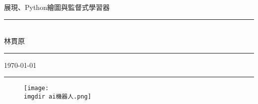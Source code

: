 \documentclass[12pt, a4paper]{book}
\begin{document}
\renewcommand{\tablename}{表}	
\renewcommand{\figurename}{圖}
\fontsize{36}{30pt}\selectfont
\thispagestyle{empty}
\begin{flushright}
    {\MB \XeLaTeX 展現、Python繪圖與監督式學習器}\\
    \rule{3in}{0.2pt}\\
    \medskip\hfill \Large {\KT 林貫原}\rule{8mm}{0pt}
    \medskip \par\vspace*{-2pt}\hfill \small\today\rule{8mm}{0pt}
\end{flushright}
\bigskip\bigskip\bigskip\bigskip
\begin{figure}[h]
    \centering
        \texttt{[image: \\imgdir ai機器人.png]}%
    \end{figure}

    
\fontsize{12}{22pt}\selectfont

\newpage
\cleardoublepage
\setcounter{tocdepth}{2} %

\tableofcontents
\newpage
\renewcommand{\numberline}[1]{\loflabel~#1\hspace*{1em}}%
\listoffigures %
\newpage
\renewcommand{\numberline}[1]{\lotlabel~#1\hspace*{1em}}%
\listoftables %
\newpage
\ifodd{} \else \thispagestyle{empty}\mbox{}\clearpage\fi %
\setcounter{page}{1} 		%







%
%
%

%
%
%   

  



\printindex 						%
\end{document}
